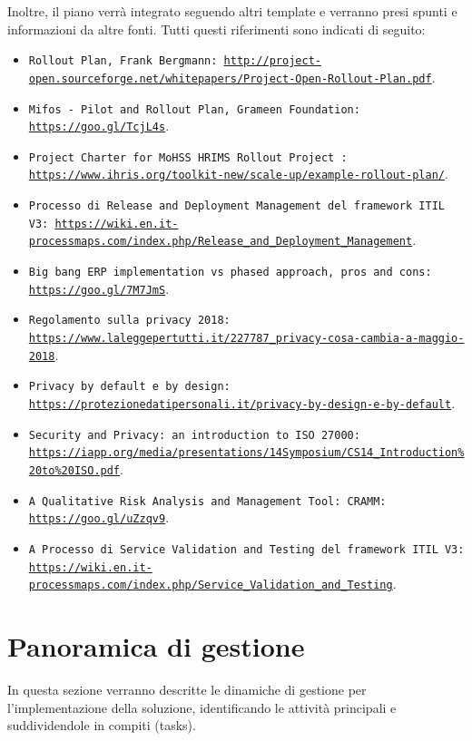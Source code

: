             Inoltre, il piano verrà integrato seguendo altri template e verranno presi spunti e informazioni da altre fonti. Tutti questi riferimenti sono indicati di seguito:
       		\begin{itemize} 
            	\item \texttt{Rollout Plan, Frank Bergmann: \url{http://project-open.sourceforge.net/whitepapers/Project-Open-Rollout-Plan.pdf}}.
                \item \texttt{Mifos - Pilot and Rollout Plan, Grameen Foundation: \url{https://goo.gl/TcjL4s}}.
                \item \texttt{Project Charter for MoHSS HRIMS Rollout Project : \url{https://www.ihris.org/toolkit-new/scale-up/example-rollout-plan/}}.
				\item \texttt{Processo di Release and Deployment Management del framework ITIL V3: \url{https://wiki.en.it-processmaps.com/index.php/Release_and_Deployment_Management}}.
                \item \texttt{Big bang ERP implementation vs phased approach, pros and cons: \url{https://goo.gl/7M7JmS}}.
                \item \texttt{Regolamento sulla privacy 2018: \url{https://www.laleggepertutti.it/227787_privacy-cosa-cambia-a-maggio-2018}}.
                \item \texttt{Privacy by default e by design: \url{https://protezionedatipersonali.it/privacy-by-design-e-by-default}}.
                \item \texttt{Security and Privacy: an introduction to ISO 27000: \url{https://iapp.org/media/presentations/14Symposium/CS14_Introduction\%20to\%20ISO.pdf}}.
                \item \texttt{A Qualitative Risk Analysis and Management Tool: CRAMM: \url{https://goo.gl/uZzqv9}}.
                
                \item \texttt{A Processo di Service Validation and Testing del framework ITIL V3: \url{https://wiki.en.it-processmaps.com/index.php/Service_Validation_and_Testing}}.
			\end{itemize}
            
		\newpage
	\section{Panoramica di gestione}
    	In questa sezione verranno descritte le dinamiche di gestione per l'implementazione della soluzione, identificando le attività principali e suddividendole in compiti (tasks).
		
